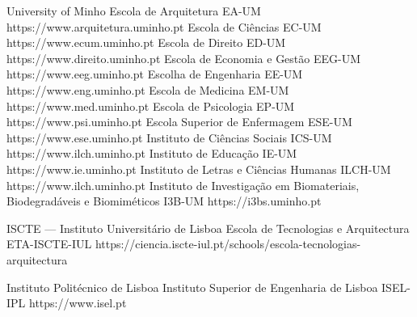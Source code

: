 \begin{ntUniversity}{University of Minho}
                  {Escola de Arquitetura}%
                  {EA-UM}%
                  {https://www.arquitetura.uminho.pt}
                  {Escola de Ciências}%
                  {EC-UM}%
                  {https://www.ecum.uminho.pt}
                  {Escola de Direito}%
                  {ED-UM}%
                  {https://www.direito.uminho.pt}
                  {Escola de Economia e Gestão}%
                  {EEG-UM}%
                  {https://www.eeg.uminho.pt}
                  {Escolha de Engenharia}%
                  {EE-UM}%
                  {https://www.eng.uminho.pt}
                  {Escola de Medicina}%
                  {EM-UM}%
                  {https://www.med.uminho.pt}
                  {Escola de Psicologia}%
                  {EP-UM}%
                  {https://www.psi.uminho.pt}
                  {Escola Superior de Enfermagem}%
                  {ESE-UM}%
                  {https://www.ese.uminho.pt}
                  {Instituto de Ciências Sociais}%
                  {ICS-UM}%
                  {https://www.ilch.uminho.pt}
                  {Instituto de Educação}%
                  {IE-UM}%
                  {https://www.ie.uminho.pt}
                  {Instituto de Letras e Ciências Humanas}%
                  {ILCH-UM}%
                  {https://www.ilch.uminho.pt}
                  {Instituto de Investigação em Biomateriais, Biodegradáveis e Biomiméticos}%
                  {I3B-UM}%
                  {https://i3bs.uminho.pt}
\end{ntUniversity}

\begin{ntUniversity}{ISCTE — Instituto Universitário de Lisboa}
             {Escola de Tecnologias e Arquitectura}%
             {ETA-ISCTE-IUL}%
             {https://ciencia.iscte-iul.pt/schools/escola-tecnologias-arquitectura}%
\end{ntUniversity}

\begin{ntUniversity}{Instituto Politécnico de Lisboa}
             {Instituto Superior de Engenharia de Lisboa}%
             {ISEL-IPL}%
             {https://www.isel.pt}%
\end{ntUniversity}

